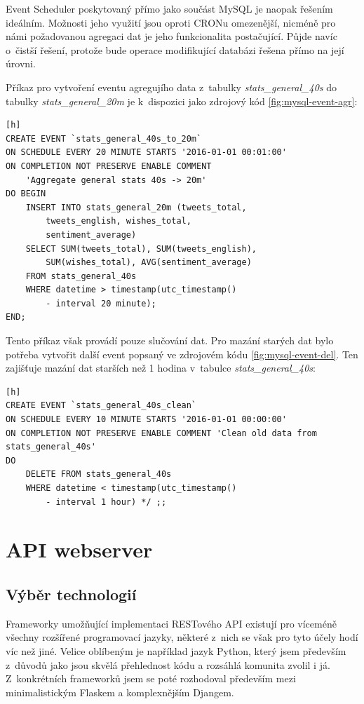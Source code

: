 \documentclass[thesis=B,czech]{FITthesis}[2012/06/26]
\begin{document}
	Event Scheduler\cite{event-scheduler} poskytovaný přímo jako součást MySQL je naopak řešením ideálním. Možnosti jeho využití jsou oproti CRONu omezenější, nicméně pro námi požadovanou agregaci dat je jeho funkcionalita postačující. Půjde navíc o~čistší řešení, protože bude operace modifikující databázi řešena přímo na její úrovni. 
	
	Příkaz pro vytvoření eventu agregujího data z~tabulky \textit{stats\_general\_40s} do tabulky \textit{stats\_general\_20m} je k~dispozici jako zdrojový kód \ref{fig:mysql-event-agr}:

\begin{lstlisting}[caption={MySQL Event provádějící agregaci dat},label=fig:mysql-event-agr][h]
CREATE EVENT `stats_general_40s_to_20m` 
ON SCHEDULE EVERY 20 MINUTE STARTS '2016-01-01 00:01:00' 
ON COMPLETION NOT PRESERVE ENABLE COMMENT 
	'Aggregate general stats 40s -> 20m' 
DO BEGIN 
	INSERT INTO stats_general_20m (tweets_total, 
		tweets_english, wishes_total, 
		sentiment_average) 
	SELECT SUM(tweets_total), SUM(tweets_english), 
		SUM(wishes_total), AVG(sentiment_average) 
	FROM stats_general_40s 
	WHERE datetime > timestamp(utc_timestamp() 
		- interval 20 minute); 
END;
\end{lstlisting}


Tento příkaz však provádí pouze slučování dat. Pro mazání starých dat bylo potřeba vytvořit další event popsaný ve zdrojovém kódu \ref{fig:mysql-event-del}. Ten zajišťuje mazání dat starších než 1 hodina v~tabulce \textit{stats\_general\_40s}:

\begin{lstlisting}[caption={MySQL Event provádějící smazání starých dat},label=fig:mysql-event-del][h]
CREATE EVENT `stats_general_40s_clean` 
ON SCHEDULE EVERY 10 MINUTE STARTS '2016-01-01 00:00:00' 
ON COMPLETION NOT PRESERVE ENABLE COMMENT 'Clean old data from stats_general_40s' 
DO 
	DELETE FROM stats_general_40s
	WHERE datetime < timestamp(utc_timestamp() 
		- interval 1 hour) */ ;;
\end{lstlisting}

\section{API webserver}
\subsection{Výběr technologií}
	Frameworky umožňující implementaci RESTového API existují pro víceméně všechny rozšířené programovací jazyky, některé z~nich se však pro tyto účely hodí víc než jiné. Velice oblíbeným je například jazyk Python, který jsem především z~důvodů jako jsou skvělá přehlednost kódu a rozsáhlá komunita zvolil i já. Z~konkrétních frameworků jsem se poté rozhodoval především mezi minimalistickým Flaskem\cite{flask} a komplexnějším Djangem\cite{django}. 
	
\end{document}
